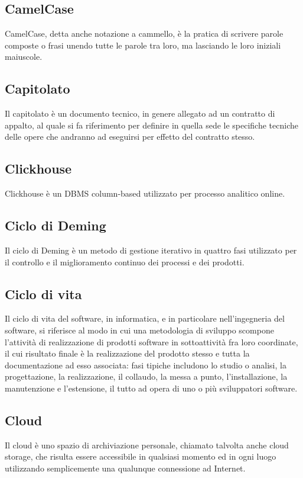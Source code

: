 
\subsection*{CamelCase}
CamelCase, detta anche notazione a cammello, è la pratica di scrivere parole composte o frasi unendo tutte le parole tra loro, ma lasciando le loro iniziali maiuscole.

\subsection*{Capitolato}
Il capitolato è un documento tecnico, in genere allegato ad un contratto di appalto, al quale si fa riferimento per definire in quella sede le specifiche tecniche delle opere che andranno ad eseguirsi per effetto del contratto stesso.

\subsection*{Clickhouse}
Clickhouse è un DBMS column-based utilizzato per processo analitico online.

\subsection*{Ciclo di Deming}
Il ciclo di Deming è un metodo di gestione iterativo in quattro fasi utilizzato per il controllo e il miglioramento continuo dei processi e dei prodotti.

\subsection*{Ciclo di vita}
Il ciclo di vita del software, in informatica, e in particolare nell'ingegneria del software, si riferisce al modo in cui una metodologia di sviluppo scompone l'attività di realizzazione di prodotti software in sottoattività fra loro coordinate, il cui risultato finale è la realizzazione del prodotto stesso e tutta la documentazione ad esso associata: fasi tipiche includono lo studio o analisi, la progettazione, la realizzazione, il collaudo, la messa a punto, l'installazione, la manutenzione e l'estensione, il tutto ad opera di uno o più sviluppatori software.

\subsection*{Cloud}
Il cloud è uno spazio di archiviazione personale, chiamato talvolta anche cloud storage, che risulta essere accessibile in qualsiasi momento ed in ogni luogo utilizzando semplicemente una qualunque connessione ad Internet.

